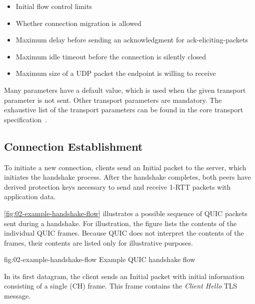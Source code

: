 \begin{itemize}

  \item Initial flow control limits

  \item Whether connection migration is allowed

  \item Maximum delay before sending an acknowledgment for \glspl{ack-eliciting-packet}

  \item Maximum idle timeout before the connection is silently closed

  \item Maximum size of a UDP packet the endpoint is willing to receive

\end{itemize}

Many parameters have a default value, which is used when the given transport parameter is not sent.
Other transport parameters are mandatory. The exhaustive list of the transport parameters can be
found in the core transport specification~\autocite[Section~7.3]{draft-ietf-quic-transport}.

\subsection{Connection Establishment}\label{sec:02-connection-establishment}

To initiate a new connection, clients send an Initial packet to the server, which initiates the
handshake process. After the handshake completes, both peers have derived protection keys necessary
to send and receive 1-RTT packets with application data.

\autoref{fig:02-example-handshake-flow} illustrates a possible sequence of QUIC packets sent during
a handshake. For illustration, the figure lists the contents of the individual QUIC frames. Because
QUIC does not interpret the contents of the \CRYPTO{} frames, their contents are listed only for
illustrative purposes.

\begin{myFigure} {fig:02-example-handshake-flow} {Example QUIC handshake flow}

\resizebox{\linewidth}{!}{}

\end{myFigure}

In its first datagram, the client sends an Initial packet with initial information consisting of a
single \CRYPTO{}(CH) frame. This frame contains the \textit{Client Hello} TLS message.

